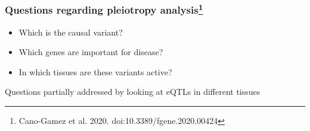 \documentclass{beamer}
\begin{document}
    \begin{frame}
        \frametitle{Questions regarding pleiotropy analysis\footnote{Cano-Gamez et al. 2020. doi:10.3389/fgene.2020.00424}}



%
        \begin{itemize}
            \item Which is the causal variant?
            \item Which genes are important for disease?
            \item In which tissues are these variants active?
        \end{itemize}
%
        \vfill
%
        Questions partially addressed by looking at eQTLs in different tissues

    \end{frame}
\end{document}

